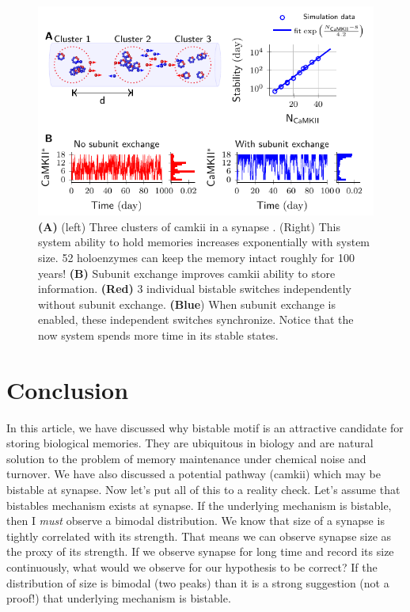\documentclass[]{resonance}
\begin{document}
\begin{figure}[]
    \caption{ \textbf{(A)} (left) Three clusters of \gls{camkii} in a synapse
        . (Right) This system ability to hold memories increases exponentially
        with system size. 52 holoenzymes can keep the memory intact roughly for
        100 years! \textbf{(B)} Subunit exchange improves \gls{camkii} ability
        to store information. \textbf{(Red)} 3 individual bistable switches independently  
        without subunit exchange. \textbf{(Blue}) When subunit exchange is enabled, these 
        independent switches synchronize. Notice that the now system spends more 
        time in its stable states.
    }\label{fig:camkii_sync}
    \includegraphics[width=\linewidth]{./figures/bistable/Fig5/figure_sync_114mm.pdf}
\end{figure}


\section{Conclusion} In this article, we have discussed why bistable motif is an
attractive candidate for storing biological memories. They are ubiquitous in
biology and are natural solution to the problem of memory maintenance under
chemical noise and turnover.  We have also discussed a potential pathway
(\gls{camkii}) which may be bistable at synapse. Now let's put all of this to a
reality check. Let's assume that bistables mechanism exists at synapse. If the
underlying mechanism is bistable, then I \emph{must} observe a bimodal
distribution. We know that size of a synapse is tightly correlated with its
strength. That means we can observe synapse size as the proxy of its strength.
If we observe synapse for long time and record its size continuously, what would
we observe for our hypothesis to be correct?  If the distribution of size is
bimodal (two peaks) than it is a strong suggestion (not a proof!) that
underlying mechanism is bistable. 
\end{document}
